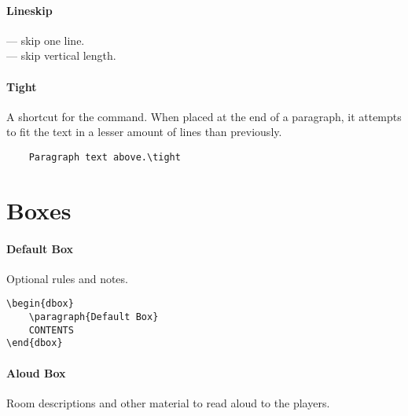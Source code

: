 \documentclass[itdr]{subfiles}
\begin{document}
\vfill
\paragraph{Lineskip}
\fbox{\lstinline!\\lineskip!} --- skip one line.\\
\fbox{\lstinline!\\lineskip[length]!} --- skip vertical length.

\vfill

\paragraph{Tight}
\vspace{-0.5\baselineskip}
A shortcut for the  command. When placed at the end of a paragraph, it attempts to fit the text in a lesser amount of lines than previously.\tight

\begin{lstlisting}
	Paragraph text above.\tight 
\end{lstlisting}
\vspace{-2\baselineskip}\faHandPointUp

\break

\section{Boxes}

\begin{dbox}
	\paragraph{Default Box}
	Optional rules and notes.\\
	\lipsum[66]
\end{dbox}

\skipline[0.5\baselineskip]

\begin{lstlisting}
\begin{dbox}
	\paragraph{Default Box}
	CONTENTS
\end{dbox}	
\end{lstlisting}

\vfill

\begin{abox}
	\paragraph{Aloud Box}
	Room descriptions and other material to read aloud to the players.\\
	\lipsum[66]
\end{abox}
\end{document}

